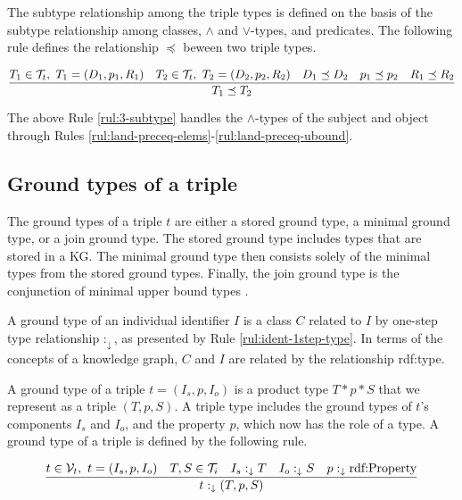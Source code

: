 \documentclass[runningheads]{llncs}
\newcommand{\darr}{\downarrow}
\newcommand{\V}{{\cal V}}
\newcommand{\T}{{\cal T}}
\begin{document}
The subtype relationship among the triple types is defined on the
basis of the subtype relationship among classes, $\land$ and
$\lor$-types, and predicates. The following rule defines the
relationship $\preceq$ beween two triple types.

\begin{equation}
\label{rul:3-subtype}
\dfrac{T_1\in\T_t,\ T_1=(D_1,p_1,R_1)\quad T_2\in\T_t,\ T_2=(D_2,p_2,R_2)\quad\/D_1\preceq\/D_2\quad\/p_1\preceq\/p_2\quad\/R_1\preceq\/R_2}
      {T_1\preceq\/T_2}
\end{equation}

\noindent
The above Rule \ref{rul:3-subtype} handles the $\land$-types of the
subject and object through Rules
\ref{rul:land-preceq-elems}-\ref{rul:land-preceq-ubound}.







\subsection{Ground types of a triple\label{sec:3-ground-types}}

\noindent
The ground types of a triple $t$ are either a stored ground type, a
minimal ground type, or a join ground type. The stored ground type
includes types that are stored in a KG. The minimal ground type then
consists solely of the minimal types from the stored ground
types. Finally, the join ground type is the conjunction of minimal
upper bound types \cite{Knudstorp2024}.
 
A ground type of an individual identifier $I$ is a class $C$ related
to $I$ by one-step type relationship $:_\darr$, as presented by Rule
\ref{rul:ident-1step-type}. In terms of the concepts of a knowledge
graph, $C$ and $I$ are related by the relationship rdf:type.

A ground type of a triple $t=(I_s,p,I_o)$ is a product type
$T*p*S$ that we represent as a triple $(T,p,S)$. A triple type
includes the ground types of $t$'s components $I_s$ and $I_o$, and the
property $p$, which now has the role of a type. A ground type of a
triple is defined by the following rule.

\begin{equation}
\label{rul:3-ground}
\dfrac{t\in\V_t,\ t=(I_s,p,I_o)\quad T,S\in\T_i\quad I_s:_\darr\/T\quad I_o:_\darr\/S\quad p:_\darr\text{rdf:Property}}
      {t:_\darr(T,p,S)}
\end{equation}
\end{document}

